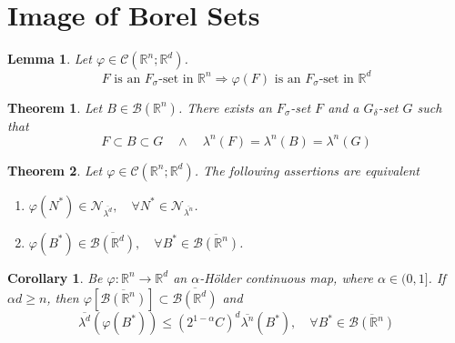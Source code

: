 \documentclass[11pt, a4paper, openany]{book}
\newtheorem{thm}{Theorem}\newtheorem{lem}{Lemma}\newtheorem{crl}{Corollary}
\theoremstyle{definition}
\begin{document}
\section{Image of Borel Sets}
    \begin{lem}
        Let $\varphi\in\mathcal{C}(\mathbb{R}^n;\mathbb{R}^d)$.
        \[F\text{ is an $F_\sigma$-set in }\mathbb{R}^n\Longrightarrow \varphi(F)\text{ is an $F_\sigma$-set in }\mathbb{R}^d\]
    \end{lem}
    \begin{thm}
        Let $B\in\mathscr{B}(\mathbb{R}^n)$. There exists an $F_\sigma$-set $F$ and a $G_\delta$-set $G$ such that
        \[F\subset B\subset G\quad\wedge\quad\lambda^n(F)=\lambda^n(B)=\lambda^n(G)\]
    \end{thm}
    \begin{thm}\label{Lusin}
        Let $\varphi\in\mathcal{C}(\mathbb{R}^n;\mathbb{R}^d)$. The following assertions are equivalent
        \begin{enumerate}
            \item $\varphi(N^*)\in\mathscr{N}_{\overline{\lambda^d}},\quad\forall N^*\in\mathscr{N}_{\overline{\lambda^n}}$.
            \item $\varphi(B^*)\in\overline{\mathscr{B}(\mathbb{R}^d)},\quad\forall B^*\in\overline{\mathscr{B}(\mathbb{R}^n)}$.
        \end{enumerate}
    \end{thm}
    \begin{crl}
        Be $\varphi:\mathbb{R}^n\rightarrow \mathbb{R}^d$ an $\alpha$-H\"{o}lder continuous map, where $\alpha\in(0,1]$. If $\alpha d\geqslant n$, then $\varphi\left[\overline{\mathscr{B}(\mathbb{R}^n)}\right]\subset \overline{\mathscr{B}(\mathbb{R}^d)}$ and
        \[\overline{\lambda^d}(\varphi(B^*))\leqslant (2^{1-\alpha}C)^d\overline{\lambda^n}(B^*),\quad\forall B^*\in\overline{\mathscr{B}(\mathbb{R}^n)}\]
    \end{crl}
\end{document}
